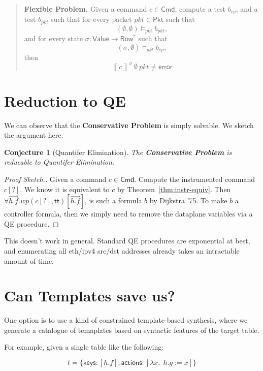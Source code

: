\documentclass{article}
\newcommand{\pkt}{\mathit{pkt}}
\newcommand{\error}{\mathsf{error}}
\newcommand{\denote}[1]{\left\llbracket#1\right\rrbracket}
\newcommand{\TRUE}{\mathsf{tt}}
\newcommand{\Value}{\mathsf{Value}}
\newcommand{\Cmd}{\mathsf{Cmd}}
\newcommand{\Pkt}{\mathsf{Pkt}}
\newcommand{\Row}{\mathsf{Row}}
\newcommand{\actions}{\mathsf{actions}}
\newcommand{\keys}{\mathsf{keys}}
\newcommand{\WP}{\textit{wp}}
\newcommand{\satisfy}[3]{({#1,#3}) \models_{#2}}
\newtheorem{conjecture}{Conjecture}
\begin{document}
\begin{quote}
  \textbf{Flexible Problem.} Given a command $c \in \Cmd$, compute a test
  $b_{\mathit{cp}}$, and a test $b_{\mathit{pkt}}$ such that
  for every packet $\pkt \in \Pkt$ such that
  \[\satisfy \emptyset \pkt \emptyset b_{\mathit{pkt}},\]
  and for every state $\sigma : \Value \to \Row^*$ such that
  \[\satisfy \sigma \pkt \emptyset b_{\mathit{cp}},\]
  then \[\denote{c}^\sigma ~\emptyset~\pkt \neq \error \]
\end{quote}



\section{Reduction to QE}

We can observe that the \textbf{Conservative Problem} is simply solvable. We
sketch the argument here.

\begin{conjecture}[Quantifer Elimination]
  The \textbf{\textrm{Conservative Problem}} is reducable to Quantifer Elimination.
\end{conjecture}

\begin{proof}[Proof Sketch.]
  Given a command $c \in \Cmd$. Compute the instrumented command $c[?]$. We know
  it is equivalent to $c$ by Theorem~\ref{thm:instr-equiv}. Then $\forall
  \overrightarrow{h.f}.\WP(c[?],\TRUE)[\overrightarrow{h.f}]$, is such a
  formula $b$ by Dijkstra '75. To make $b$ a controller formula, then we simply
  need to remove the dataplane variables via a QE procedure.
\end{proof}

This doesn't work in general. Standard QE procedures are exponential at best, and
enumerating all eth/ipv4 src/dst addresses already takes an intractable amount
of time.

\section{Can Templates save us?}

One option is to use a kind of constrained template-based synthesis, where we
generate a catalogue of temaplates based on syntactic features of the target table.

For example, given a single table like the following:

\[t = \{\keys: [h.f]; \actions: [\lambda x.~~h.g:= x]\}\]
\end{document}
